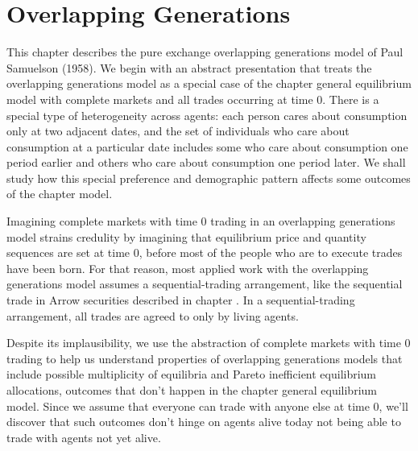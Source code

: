 

%




\def\toone{{t+1}}
\def\ttwo{{t+2}}
\def\tthree{{t+3}}
\def\Tone{{T+1}}
\def\TTT{{T-1}}
\def\rtr{{\rm tr}}
\def\tone{{t+1}}



\chapter{Overlapping Generations\label{ogmodels}}

This chapter describes the pure exchange overlapping generations
model of Paul Samuelson (1958).
 We begin with an
abstract presentation  that treats the overlapping
generations model as a special case of the chapter 
general equilibrium model with complete markets and all
trades occurring at time $0$.
There is a special  type of heterogeneity across
agents: each person 
cares about consumption only at  two adjacent dates, and the set of
individuals who care about consumption at a particular date
includes some who care about consumption one period earlier and others
who care about consumption one period later.   We shall study
how  this
special preference and demographic  pattern affects some
 outcomes of the chapter  model.

  Imagining
complete markets with time $0$ trading in
an overlapping generations model strains
credulity by imagining  that equilibrium price and quantity sequences
are set at time $0$,
before most of the people who are to execute  trades have been born.
  For that reason, most applied work with the overlapping generations
model assumes a sequential-trading arrangement, like
the sequential trade in Arrow securities described   in chapter
.
In a  sequential-trading arrangement,  all trades are 
agreed to only by living agents.

Despite its implausibility, we use the abstraction of
complete markets with time 0 trading to help us  understand
properties of   overlapping generations models 
that include  possible  multiplicity of equilibria and Pareto inefficient
equilibrium allocations, outcomes that don't  happen in the 
chapter  general equilibrium model. Since we  assume that everyone can 
trade with anyone else at time 0, we'll discover that such  outcomes 
 don't  hinge on 
agents alive today not being able to trade with agents not yet alive.

